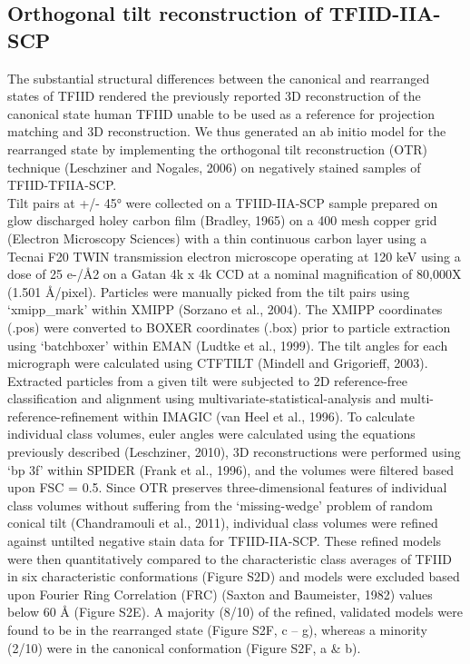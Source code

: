 \subsection{Orthogonal tilt reconstruction of TFIID-IIA-SCP} 
The substantial structural differences between the canonical and rearranged states of TFIID rendered the previously reported 3D reconstruction of the canonical state human TFIID unable to be used as a reference for projection matching and 3D reconstruction.  We thus generated an ab initio model for the rearranged state by implementing the orthogonal tilt reconstruction (OTR) technique (Leschziner and Nogales, 2006) on negatively stained samples of TFIID-TFIIA-SCP. \\
\indent Tilt pairs at +/- 45° were collected on a TFIID-IIA-SCP sample prepared on glow discharged holey carbon film (Bradley, 1965) on a 400 mesh copper grid (Electron Microscopy Sciences) with a thin continuous carbon layer using a Tecnai F20 TWIN transmission electron microscope operating at 120 keV using a dose of 25 e-/Å2 on a Gatan 4k x 4k CCD at a nominal magnification of 80,000X (1.501 Å/pixel).  Particles were manually picked from the tilt pairs using ‘xmipp_mark’ within XMIPP (Sorzano et al., 2004).  The XMIPP coordinates (.pos) were converted to BOXER coordinates (.box) prior to particle extraction using ‘batchboxer’ within EMAN (Ludtke et al., 1999).  The tilt angles for each micrograph were calculated using CTFTILT (Mindell and Grigorieff, 2003).  Extracted particles from a given tilt were subjected to 2D reference-free classification and alignment using multivariate-statistical-analysis and multi-reference-refinement within IMAGIC (van Heel et al., 1996).  To calculate individual class volumes, euler angles were calculated using the equations previously described (Leschziner, 2010), 3D reconstructions were performed using ‘bp 3f’ within SPIDER (Frank et al., 1996), and the volumes were filtered based upon FSC = 0.5.   
Since OTR preserves three-dimensional features of individual class volumes without suffering from the ‘missing-wedge’ problem of random conical tilt (Chandramouli et al., 2011), individual class volumes were refined against untilted negative stain data for TFIID-IIA-SCP.  These refined models were then quantitatively compared to the characteristic class averages of TFIID in six characteristic conformations (Figure S2D) and models were excluded based upon Fourier Ring Correlation (FRC) (Saxton and Baumeister, 1982) values below 60 Å (Figure S2E).  A majority (8/10) of the refined, validated models were found to be in the rearranged state (Figure S2F, c – g), whereas a minority (2/10) were in the canonical conformation (Figure S2F, a & b).  

